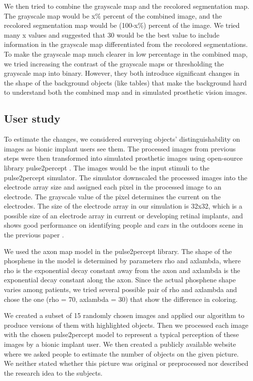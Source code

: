 We then tried to combine the grayscale map and the recolored segmentation map. The grayscale map would be x\% percent of the combined image, and the recolored segmentation map would be (100-x\%) percent of the image. We tried many x values and suggested that 30 would be the best value to include information in the grayscale map differentiated from the recolored segmentations.
To make the grayscale map much clearer in low percentage in the combined map, we tried increasing the contrast of the grayscale maps or thresholding the grayscale map into binary. However, they both introduce significant changes in the shape of the background objects (like tables) that make the background hard to understand both the combined map and in simulated prosthetic vision images.

\subsection{User study}
\label{methods:survey}

To estimate the changes, we considered surveying objects' distinguishability on images as bionic implant users see them. 
The processed images from previous steps were then transformed into simulated prosthetic images using open-source library pulse2percept \cite{Beyeler148015}. The images would be the input stimuli to the pulse2percept simulator. The simulator downscaled the processed images into the electrode array size and assigned each pixel in the processed image to an electrode. The grayscale value of the pixel determines the current on the electrodes. The size of the electrode array in our simulation is 32x32, which is a possible size of an electrode array in current or developing retinal implants, and shows good performance on identifying people and cars in the outdoors scene in the previous paper \cite{han2021deep}.

We used the axon map model in the pulse2percept library. The shape of the phosphene in the model is determined by parameters rho and axlambda, where rho is the exponential decay constant away from the axon and axlambda is the exponential decay constant along the axon. Since the actual phosphene shape varies among patients, we tried several possible pair of rho and axlambda and chose the one (rho = 70, axlambda = 30) that show the difference in coloring.

We created a subset of 15 randomly chosen images and applied our algorithm to produce versions of them with highlighted objects. Then we processed each image with the chosen pulse2percept model to represent a typical perception of these images by a bionic implant user. We then created a publicly available website where we asked people to estimate the number of objects on the given picture. We neither stated whether this picture was original or preprocessed nor described the research idea to the subjects. 
